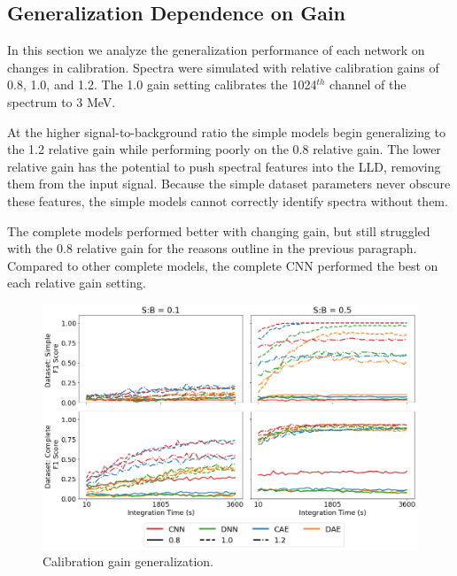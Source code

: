 \subsection{Generalization Dependence on Gain}

In this section we analyze the generalization performance of each network on changes in calibration. Spectra were simulated with relative calibration gains of 0.8, 1.0, and 1.2. The 1.0 gain setting calibrates the 1024$^{th}$ channel of the spectrum to 3 MeV.

At the higher signal-to-background ratio the simple models begin generalizing to the 1.2 relative gain while performing poorly on the 0.8 relative gain. The lower relative gain has the potential to push spectral features into the LLD, removing them from the input signal. Because the simple dataset parameters never obscure these features, the simple models cannot correctly identify spectra without them.

The complete models performed better with changing gain, but still struggled with the 0.8 relative gain for the reasons outline in the previous paragraph. Compared to other complete models, the complete CNN performed the best on each relative gain setting.

\begin{figure}[H]
	\centering
	\includegraphics[width=1.0\linewidth]{images/sim-generalization-cal}
	\caption{Calibration gain generalization.}
	\label{fig:sim-generalization-cal}
\end{figure}




